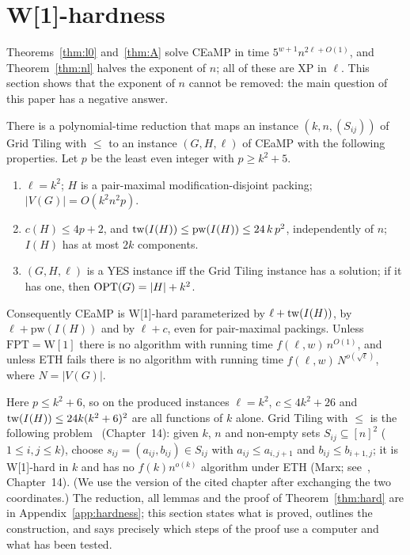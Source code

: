 \section{W[1]-hardness}\label{sec:hardness}
Theorems~\ref{thm:l0} and~\ref{thm:A} solve CEaMP in time $5^{w+1}n^{2\ell+O(1)}$, and Theorem~\ref{thm:nl} halves the exponent of $n$; all of these are XP in $\ell$. This section shows that the exponent of $n$ cannot be removed: the main question of this paper has a negative answer.
\begin{theorem}[{W[1]}-hardness]\label{thm:hard}
There is a polynomial-time reduction that maps an instance $(k,n,(S_{ij}))$ of Grid Tiling with $\le$ to an instance $(G,H,\ell)$ of CEaMP with the following properties. Let $p$ be the least even integer with $p\ge k^2+5$.
\begin{enumerate}
\item[(i)] $\ell=k^2$; $H$ is a pair-maximal modification-disjoint packing; $|V(G)|=O(k^2n^2p)$.
\item[(ii)] $c(H)\le 4p+2$, and $\mathrm{tw}(I(H))\le\mathrm{pw}(I(H))\le 24\,k\,p^2$, independently of $n$; $I(H)$ has at most $2k$ components.
\item[(iii)] $(G,H,\ell)$ is a YES instance iff the Grid Tiling instance has a solution; if it has one, then $\mathrm{OPT}(G)=|H|+k^2$.
\end{enumerate}
Consequently CEaMP is W[1]-hard parameterized by $\ell+\mathrm{tw}(I(H))$, by $\ell+\mathrm{pw}(I(H))$ and by $\ell+c$, even for pair-maximal packings. Unless $\mathrm{FPT}=\mathrm{W[1]}$ there is no algorithm with running time $f(\ell,w)\,n^{O(1)}$, and unless ETH fails there is no algorithm with running time $f(\ell,w)\,N^{o(\sqrt{\ell})}$, where $N=|V(G)|$.
\end{theorem}
Here $p\le k^2+6$, so on the produced instances $\ell=k^2$, $c\le 4k^2+26$ and $\mathrm{tw}(I(H))\le 24k(k^2+6)^2$ are all functions of $k$ alone. Grid Tiling with $\le$ is the following problem~\cite{Cygan15} (Chapter~14): given $k$, $n$ and non-empty sets $S_{ij}\subseteq[n]^2$ ($1\le i,j\le k$), choose $s_{ij}=(a_{ij},b_{ij})\in S_{ij}$ with $a_{ij}\le a_{i,j+1}$ and $b_{ij}\le b_{i+1,j}$; it is W[1]-hard in $k$ and has no $f(k)n^{o(k)}$ algorithm under ETH (Marx; see~\cite{Cygan15}, Chapter~14). (We use the version of the cited chapter after exchanging the two coordinates.) The reduction, all lemmas and the proof of Theorem~\ref{thm:hard} are in Appendix~\ref{app:hardness}; this section states what is proved, outlines the construction, and says precisely which steps of the proof use a computer and what has been tested.

